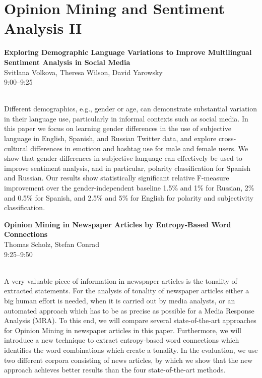 \documentclass[twoside,makeidx]{book}
\begin{document}
\section{Opinion Mining and Sentiment Analysis II}
\vspace{-1em}
\par\vspace{2em}\noindent%
\begin{minipage}{\linewidth}%
\begin{center}
\textbf{\normalsize Exploring Demographic Language Variations to Improve Multilingual Sentiment Analysis in Social Media}\\
\normalsize  Svitlana Volkova,  Theresa Wilson,  David Yarowsky\\
{\small 9:00--9:25}\\
\end{center}
\end{minipage}\\[0.5em]
\nopagebreak%
\noindent%
{\small Different demographics, e.g., gender or age, can demonstrate substantial variation in their language use, particularly in informal contexts such as social media. In this paper we focus on learning gender differences in the use of subjective language in English, Spanish, and Russian Twitter data, and explore cross-cultural differences in emoticon and hashtag use for male and female users. We show that gender differences in subjective language can effectively be used to improve sentiment analysis, and in particular, polarity classification for Spanish and Russian. Our results show statistically significant relative F-measure improvement over the gender-independent baseline 1.5\% and 1\% for Russian, 2\% and 0.5\% for Spanish, and 2.5\% and 5\% for English for polarity and subjectivity classification.}
\par\vspace{2em}\noindent%
\begin{minipage}{\linewidth}%
\begin{center}
\textbf{\normalsize Opinion Mining in Newspaper Articles by Entropy-Based Word Connections}\\
\normalsize  Thomas Scholz,  Stefan Conrad\\
{\small 9:25--9:50}\\
\end{center}
\end{minipage}\\[0.5em]
\nopagebreak%
\noindent%
{\small A very valuable piece of information in newspaper articles is the tonality of extracted statements. For the analysis of tonality of newspaper articles either a big human effort is needed, when it is carried out by media analysts, or an automated approach which has to be as precise as possible for a Media Response Analysis (MRA). To this end, we will compare several state-of-the-art approaches for Opinion Mining in newspaper articles in this paper. Furthermore, we will introduce a new technique to extract entropy-based word connections which identifies the word combinations which create a tonality. In the evaluation, we use two different corpora consisting of news articles, by which we show that the new approach achieves better results than the four state-of-the-art methods.}
\end{document}
